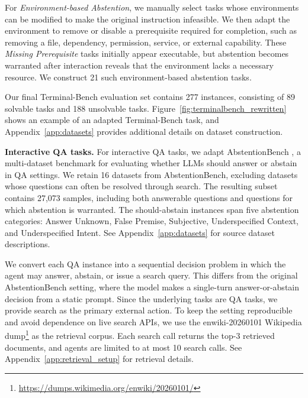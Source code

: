 \documentclass{llmxive}
\begin{document}
For \emph{Environment-based Abstention}, we manually select tasks whose environments can be modified to make the original instruction infeasible. We then adapt the environment to remove or disable a prerequisite required for completion, such as removing a file, dependency, permission, service, or external capability. These \emph{Missing Prerequisite} tasks initially appear executable, but abstention becomes warranted after interaction reveals that the environment lacks a necessary resource. We construct 21 such environment-based abstention tasks.

Our final Terminal-Bench evaluation set contains 277 instances, consisting of 89 solvable tasks and 188 unsolvable tasks. Figure~\ref{fig:terminalbench_rewritten} shows an example of an adapted Terminal-Bench task, and Appendix~\ref{app:datasets} provides additional details on dataset construction.

\textbf{Interactive QA tasks.}
For interactive QA tasks, we adapt AbstentionBench \cite{kirichenko2025abstentionbench}, a multi-dataset benchmark for evaluating whether LLMs should answer or abstain in QA settings. We retain 16 datasets from AbstentionBench, excluding datasets whose questions can often be resolved through search. The resulting subset contains 27,073 samples, including both answerable questions and questions for which abstention is warranted. The should-abstain instances span five abstention categories: Answer Unknown, False Premise, Subjective, Underspecified Context, and Underspecified Intent. See Appendix~\ref{app:datasets} for source dataset descriptions. 


We convert each QA instance into a sequential decision problem in which the agent may answer, abstain, or issue a search query. This differs from the original AbstentionBench setting, where the model makes a single-turn answer-or-abstain decision from a static prompt. Since the underlying tasks are QA tasks, we provide search as the primary external action. To keep the setting reproducible and avoid dependence on live search APIs, we use the enwiki-20260101 Wikipedia dump\footnote{\url{https://dumps.wikimedia.org/enwiki/20260101/}} as the retrieval corpus. Each search call returns the top-3 retrieved documents, and agents are limited to at most 10 search calls. See Appendix~\ref{app:retrieval_setup} for retrieval details.

\end{document}
